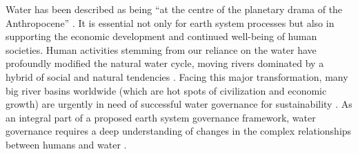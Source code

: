 \label{Intro.}
Water has been described as being ``at the centre of the planetary drama of the Anthropocene''
\cite{gleesonIlluminatingwatercycle2020}.
It is essential not only for earth system processes but also in supporting the economic development and continued well-being of human societies. Human activities stemming from our reliance on the water have profoundly modified the natural water cycle, moving rivers dominated by a hybrid of social and natural tendencies
\cite{gleesonIlluminatingwatercycle2020,sivapalanSociohydrologynewscience2012,qinTheoreticalframeworkdualistic2014,abbottwatercycleAnthropocene2019,leviaHomogenizationterrestrialwater2020}.
Facing this major transformation, many big river basins worldwide (which are hot spots of civilization and economic growth) are urgently in need of successful water governance for sustainability
\cite{bestAnthropogenicstressesworld2019,falkenmarkUnderstandingwaterresilience2019,dibaldassarreSociohydrologyScientificChallenges2019}.
As an integral part of a proposed earth system governance framework, water governance requires a deep understanding of changes in the complex relationships between humans and water
\cite{dibaldassarreSociohydrologyScientificChallenges2019,biermannNavigatingAnthropoceneImproving2012,steffenemergenceevolutionEarth2020}.

